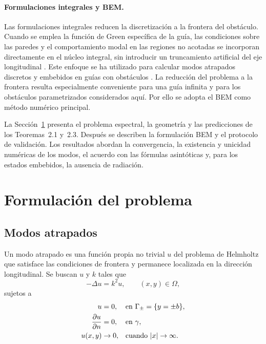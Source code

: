 \documentclass[11pt]{article}
\begin{document}
\paragraph{Formulaciones integrales y BEM.}
Las formulaciones integrales reducen la discretización a la frontera del obstáculo. Cuando se emplea la función de Green específica de la guía, las condiciones sobre las paredes y el comportamiento modal en las regiones no acotadas se incorporan directamente en el núcleo integral, sin introducir un truncamiento artificial del eje longitudinal \cite{Linton1992,Pozrikidis2002}. Este enfoque se ha utilizado para calcular modos atrapados discretos y embebidos en guías con obstáculos \cite{Linton1992,SargentMestel2019}. La reducción del problema a la frontera resulta especialmente conveniente para una guía infinita y para los obstáculos parametrizados considerados aquí. Por ello se adopta el BEM como método numérico principal.

La Sección~\ref{FP} presenta el problema espectral, la geometría y las predicciones de los Teoremas~2.1 y~2.3. Después se describen la formulación BEM y el protocolo de validación. Los resultados abordan la convergencia, la existencia y unicidad numéricas de los modos, el acuerdo con las fórmulas asintóticas y, para los estados embebidos, la ausencia de radiación.

\section{Formulación del problema}\label{FP}

\subsection{Modos atrapados}\label{subsec:trapped_modes}

Un modo atrapado es una función propia no trivial \(u\) del problema de Helmholtz que satisface las condiciones de frontera y permanece localizada en la dirección longitudinal. Se buscan \(u\) y \(k\) tales que
\begin{equation}
-\Delta u=k^2u,
\qquad (x,y)\in\Omega,
\end{equation}
sujetos a
\begin{align}
u&=0,
&&\text{en }\Gamma_\pm=\{y=\pm b\},\\
\pdv{u}{n}&=0,
&&\text{en }\gamma,\\
u(x,y)&\to0,
&&\text{cuando }|x|\to\infty.
\end{align}
\end{document}
